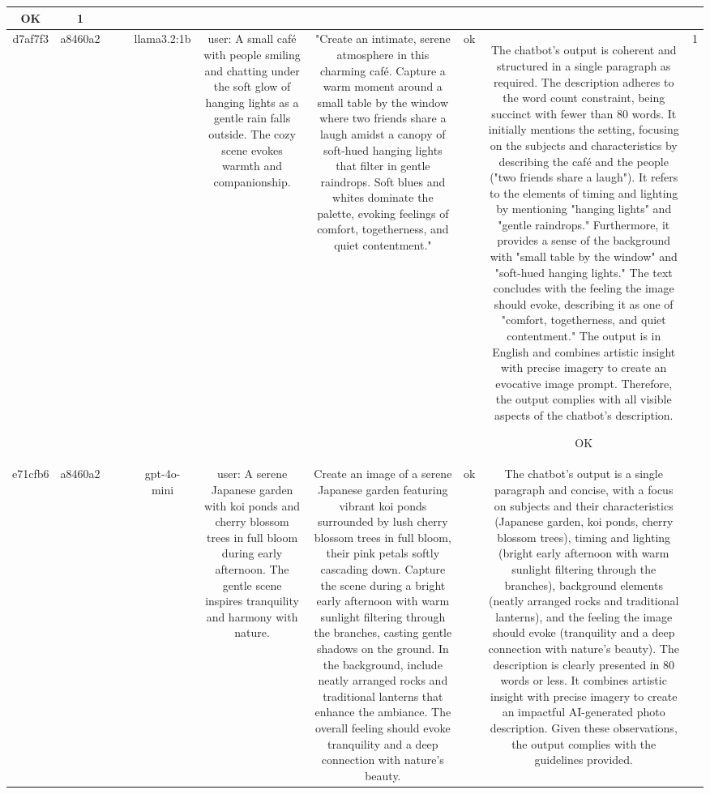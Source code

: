 \begin{table}[h!]
\begin{tabular}{|c|c|c|c|c|c|c|c|c|c|}
OK & 1\\
\hline
d7af7f3 & a8460a2 &  &  & llama3.2:1b & user: A small café with people smiling and chatting under the soft glow of hanging lights as a gentle rain falls outside. The cozy scene evokes warmth and companionship. & "Create an intimate, serene atmosphere in this charming café. Capture a warm moment around a small table by the window where two friends share a laugh amidst a canopy of soft-hued hanging lights that filter in gentle raindrops. Soft blues and whites dominate the palette, evoking feelings of comfort, togetherness, and quiet contentment." & ok & The chatbot's output is coherent and structured in a single paragraph as required. The description adheres to the word count constraint, being succinct with fewer than 80 words. It initially mentions the setting, focusing on the subjects and characteristics by describing the café and the people ("two friends share a laugh"). It refers to the elements of timing and lighting by mentioning "hanging lights" and "gentle raindrops." Furthermore, it provides a sense of the background with "small table by the window" and "soft-hued hanging lights." The text concludes with the feeling the image should evoke, describing it as one of "comfort, togetherness, and quiet contentment." The output is in English and combines artistic insight with precise imagery to create an evocative image prompt. Therefore, the output complies with all visible aspects of the chatbot's description.

OK & 1\\
\hline
e71cfb6 & a8460a2 &  &  & gpt-4o-mini & user: A serene Japanese garden with koi ponds and cherry blossom trees in full bloom during early afternoon. The gentle scene inspires tranquility and harmony with nature. & Create an image of a serene Japanese garden featuring vibrant koi ponds surrounded by lush cherry blossom trees in full bloom, their pink petals softly cascading down. Capture the scene during a bright early afternoon with warm sunlight filtering through the branches, casting gentle shadows on the ground. In the background, include neatly arranged rocks and traditional lanterns that enhance the ambiance. The overall feeling should evoke tranquility and a deep connection with nature's beauty. & ok & The chatbot's output is a single paragraph and concise, with a focus on subjects and their characteristics (Japanese garden, koi ponds, cherry blossom trees), timing and lighting (bright early afternoon with warm sunlight filtering through the branches), background elements (neatly arranged rocks and traditional lanterns), and the feeling the image should evoke (tranquility and a deep connection with nature's beauty). The description is clearly presented in 80 words or less. It combines artistic insight with precise imagery to create an impactful AI-generated photo description. Given these observations, the output complies with the guidelines provided.


\end{tabular}
\end{table}
